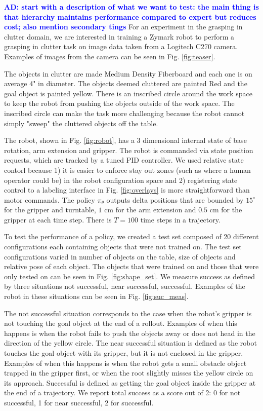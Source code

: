 \documentclass[10pt, conference]{ieeeconf}      %
\newcommand{\adnote}[1]{\ifthenelse{ \boolean{include-notes}}%
 {\textcolor{blue}{\textbf{AD: #1}}}{}}
\begin{document}
\adnote{start with a description of what we want to test: the main thing is that hierarchy maintains performance compared to expert but reduces cost; also mention secondary tings}
For an experiment in the grasping in clutter domain, we are interested in training a Zymark robot to perform a grasping in clutter task on image data taken from a Logitech C270 camera. Examples of images from the camera can be seen in Fig. \ref{fig:teaser}.

The objects in clutter are made Medium Density Fiberboard and each one is on average 4" in diameter. The objects deemed cluttered are painted Red and the goal object is painted yellow. There is an inscribed circle around the work space to keep the robot from pushing the objects outside of the work space. The inscribed circle can make the task more challenging because the robot cannot simply "sweep" the cluttered objects off the table. 

The robot, shown in Fig. \ref{fig:robot}, has a 3 dimensional internal state of base rotation, arm extension and gripper. The robot is commanded via state position requests, which are tracked by a tuned PID controller. We used relative state contorl because 1) it is easier to enforce stay out zones (such as where a human operator could be) in the robot configuration space and 2) registering state control to a labeling interface in Fig. \ref{fig:overlays} is more straightforward than motor commands.   The policy $\pi_\theta$ outputs delta positions that are bounded by $15^\circ$ for the gripper and turntable, $1$ cm for the arm extension and $0.5$ cm for the gripper at each time step. There is $T=100$ time steps in a trajectory. 

To test the performance of a policy, we created a test set composed of 20 different configurations each containing objects that were not trained on.  The test set configurations varied in number of objects on the table, size of objects and relative pose of each object. The objects that were trained on and those that were only tested on can be seen in Fig. \ref{fig:shape_set}.  We measure success as defined by three situations not successful, near successful, successful. Examples of the robot in these situations can be seen in Fig. \ref{fig:suc_meas}. 

The not successful situation corresponds to the case when the robot's gripper is not touching the goal object at the end of a rollout. Examples of when this happens is when the robot fails to push the objects away or does not head in the direction of the yellow circle. The near successful situation is defined as the robot touches the goal object with its gripper, but it is not enclosed in the gripper. Examples of when this happens is when the robot gets a small obstacle object trapped in the gripper first, or when the root slightly misses the yellow circle on its approach. Successful is defined as getting the goal object inside the gripper at the end of a trajectory. We report total success as a score out of 2: 0 for not successful, 1 for near successful, 2 for successful. 
\end{document}
